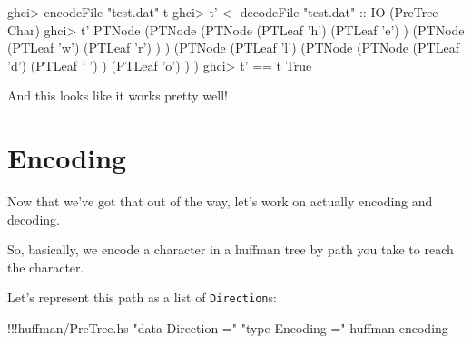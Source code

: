 \documentclass[]{article}
\newenvironment{Shaded}{}{}
\newcommand{\DataTypeTok}[1]{\textcolor[rgb]{0.56,0.13,0.00}{{#1}}}
\newcommand{\CharTok}[1]{\textcolor[rgb]{0.25,0.44,0.63}{{#1}}}
\newcommand{\StringTok}[1]{\textcolor[rgb]{0.25,0.44,0.63}{{#1}}}
\newcommand{\OtherTok}[1]{\textcolor[rgb]{0.00,0.44,0.13}{{#1}}}
\newcommand{\FunctionTok}[1]{\textcolor[rgb]{0.02,0.16,0.49}{{#1}}}
\newcommand{\NormalTok}[1]{{#1}}
\begin{document}
\begin{Shaded}
\begin{Highlighting}[]
\NormalTok{ghci}\FunctionTok{>} \NormalTok{encodeFile }\StringTok{"test.dat"} \NormalTok{t}
\NormalTok{ghci}\FunctionTok{>} \NormalTok{t' }\OtherTok{<-} \NormalTok{decodeFile }\StringTok{"test.dat"}\OtherTok{ ::} \DataTypeTok{IO} \NormalTok{(}\DataTypeTok{PreTree} \DataTypeTok{Char}\NormalTok{)}
\NormalTok{ghci}\FunctionTok{>} \NormalTok{t'}
\DataTypeTok{PTNode} \NormalTok{(}\DataTypeTok{PTNode} \NormalTok{(}\DataTypeTok{PTNode} \NormalTok{(}\DataTypeTok{PTLeaf} \CharTok{'h'}\NormalTok{)}
                       \NormalTok{(}\DataTypeTok{PTLeaf} \CharTok{'e'}\NormalTok{)}
               \NormalTok{)}
               \NormalTok{(}\DataTypeTok{PTNode} \NormalTok{(}\DataTypeTok{PTLeaf} \CharTok{'w'}\NormalTok{)}
                       \NormalTok{(}\DataTypeTok{PTLeaf} \CharTok{'r'}\NormalTok{)}
               \NormalTok{)}
       \NormalTok{)}
       \NormalTok{(}\DataTypeTok{PTNode} \NormalTok{(}\DataTypeTok{PTLeaf} \CharTok{'l'}\NormalTok{)}
               \NormalTok{(}\DataTypeTok{PTNode} \NormalTok{(}\DataTypeTok{PTNode} \NormalTok{(}\DataTypeTok{PTLeaf} \CharTok{'d'}\NormalTok{)}
                               \NormalTok{(}\DataTypeTok{PTLeaf} \CharTok{' '}\NormalTok{)}
                       \NormalTok{)}
                       \NormalTok{(}\DataTypeTok{PTLeaf} \CharTok{'o'}\NormalTok{)}
               \NormalTok{)}
       \NormalTok{)}
\NormalTok{ghci}\FunctionTok{>} \NormalTok{t' }\FunctionTok{==} \NormalTok{t}
\DataTypeTok{True}
\end{Highlighting}
\end{Shaded}

And this looks like it works pretty well!

\section{Encoding}\label{encoding}

Now that we've got that out of the way, let's work on actually encoding
and decoding.

So, basically, we encode a character in a huffman tree by path you take
to reach the character.

Let's represent this path as a list of \texttt{Direction}s:

\begin{Shaded}
\begin{Highlighting}[]
\FunctionTok{!!!}\NormalTok{huffman}\FunctionTok{/}\NormalTok{PreTree.hs }\StringTok{"data Direction ="} \StringTok{"type Encoding ="} \NormalTok{huffman}\FunctionTok{-}\NormalTok{encoding}
\end{Highlighting}
\end{Shaded}
\end{document}
